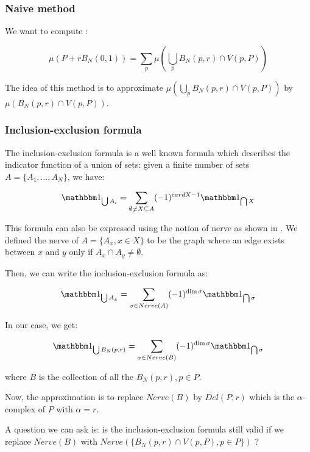 \subsubsection{Naive method}

We want to compute :

$$ \mu(P + r B_N(0, 1)) = \sum_p \mu(\bigcup_p B_N(p, r) \cap V(p, P)) $$

The idea of this method is to approximate $ \mu(\bigcup_p B_N(p, r) \cap V(p,
P)) $ by $ \mu(B_N(p, r) \cap V(p, P)) $.

\subsubsection{Inclusion-exclusion formula}

The inclusion-exclusion formula is a well known formula which describes the
indicator function of a union of sets: given a finite number of sets $ A = \{
A_1, \ldots, A_N \} $, we have:

$$ \indicator{\bigcup A_i} = \sum_{\emptyset \neq X \subseteq A} (-1)^{card X -
    1} \indicator{\bigcap X} $$

This formula can also be expressed using the notion of nerve as shown in
\cite{attali2007inclusion}. We defined the nerve of $ A = \{ A_x, x \in X \} $
to be the graph where an edge exists between $ x $ and $ y $ only if $ A_x \cap
A_y \neq \emptyset $.

Then, we can write the inclusion-exclusion formula as:

$$ \indicator{\bigcup A_x} = \sum_{\sigma \in Nerve(A)} (-1)^{\dim \sigma}
\indicator{\bigcap \sigma} $$

In our case, we get:

\begin{equation}
    \indicator{\bigcup B_N(p, r)} = \sum_{\sigma \in Nerve(B)} (-1)^{\dim \sigma}
    \indicator{\bigcap \sigma}
    \label{eqn:incl_excl_simplices}
\end{equation}

where $ B $ is the collection of all the $ B_N(p, r), p \in P $.

Now, the approximation is to replace $ Nerve(B) $ by $ Del(P, r) $ which is the
$\alpha$-complex of $ P $ with $ \alpha = r $.


A question we can ask is: is the inclusion-exclusion formula still valid if we
replace $ Nerve(B) $ with $ Nerve(\{ B_N(p, r) \cap V(p, P), p \in P\}) $ ?

